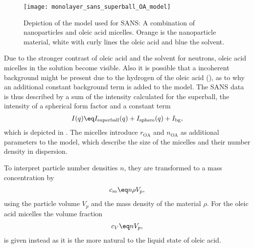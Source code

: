 \documentclass[\main/dresen_thesis.tex]{subfiles}
\begin{document}
    \begin{figure}[tb]
      \centering
      \texttt{[image: monolayer\_sans\_superball\_OA\_model]}
      \caption{\label{fig:monolayers:charMethods:SANSModel}Depiction of the model used for SANS: A combination of nanoparticles and oleic acid micelles. Orange is the nanoparticle material, white with curly lines the oleic acid and blue the solvent.}
    \end{figure}

    Due to the stronger contrast of oleic acid and the solvent for neutrons, oleic acid micelles in the solution become visible.
    Also it is possible that a incoherent background might be present due to the hydrogen of the oleic acid (), as to why an additional constant background term is added to the model.
    The SANS data is thus described by a sum of the intensity calculated for the superball, the intensity of a spherical form factor and a constant term
    \begin{align}
      I(q) \eq I_\mathrm{superball}(q) + I_\mathrm{sphere}(q) + I_\mathrm{bg},
    \end{align}
    which is depicted in .
    The micelles introduce $r_\mathrm{OA}$ and $n_\mathrm{OA}$ as additional parameters to the model, which describe the size of the micelles and their number density in dispersion.

    To interpret particle number densities $n$, they are transformed to a mass concentration by
    \begin{align}
      c_m \eq n \rho V_p,
    \end{align}
    using the particle volume $V_p$ and the mass density of the material $\rho$.
    For the oleic acid micelles the volume fraction
    \begin{align}
      c_V \eq n V_p,
    \end{align}
    is given instead as it is the more natural to the liquid state of oleic acid.
\end{document}
